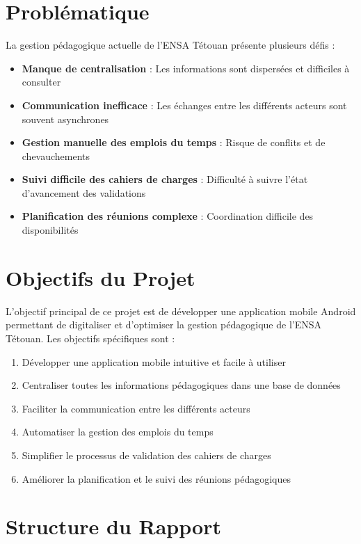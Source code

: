 \documentclass[12pt,a4paper]{report}
\begin{document}
\section{Problématique}

La gestion pédagogique actuelle de l'ENSA Tétouan présente plusieurs défis :

\begin{itemize}
    \item \textbf{Manque de centralisation} : Les informations sont dispersées et difficiles à consulter
    \item \textbf{Communication inefficace} : Les échanges entre les différents acteurs sont souvent asynchrones
    \item \textbf{Gestion manuelle des emplois du temps} : Risque de conflits et de chevauchements
    \item \textbf{Suivi difficile des cahiers de charges} : Difficulté à suivre l'état d'avancement des validations
    \item \textbf{Planification des réunions complexe} : Coordination difficile des disponibilités
\end{itemize}

\section{Objectifs du Projet}

L'objectif principal de ce projet est de développer une application mobile Android permettant de digitaliser et d'optimiser la gestion pédagogique de l'ENSA Tétouan. Les objectifs spécifiques sont :

\begin{enumerate}
    \item Développer une application mobile intuitive et facile à utiliser
    \item Centraliser toutes les informations pédagogiques dans une base de données
    \item Faciliter la communication entre les différents acteurs
    \item Automatiser la gestion des emplois du temps
    \item Simplifier le processus de validation des cahiers de charges
    \item Améliorer la planification et le suivi des réunions pédagogiques
\end{enumerate}

\section{Structure du Rapport}
\end{document}
